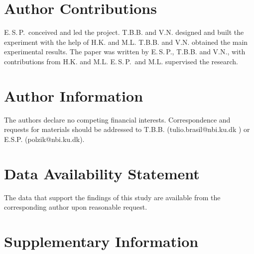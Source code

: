 \documentclass[final,twocolumn,english,prl,notitlepage,nofootinbib,floatfix,longbibliography,superscriptaddress
]{revtex4-2}
\begin{document}
\section*{Author Contributions}
E.\,S.\,P.\ conceived and led the project. 
T.B.B. and V.N. designed and built the experiment with the help of H.K. and M.L. T.B.B. and V.N. obtained the main experimental results.
The paper was written by E.\,S.\,P., T.B.B. and V.N., with contributions from H.K. and M.L. E.\,S.\,P.\ and M.L. supervised the research.

\section*{Author Information}
 The authors declare no competing financial 
interests. Correspondence and 
requests for materials should be addressed to T.B.B. (tulio.brasil@nbi.ku.dk ) or E.S.P. (polzik@nbi.ku.dk).

\section*{Data Availability Statement}
The data that support the findings of this study are available from the corresponding author upon reasonable request.


\appendix
\clearpage

\setcounter{page}{1}
\renewcommand{\thepage}{SI~\arabic{page}}

\setcounter{figure}{0}
\renewcommand{\thefigure}{SI\arabic{figure}}

\setcounter{table}{0}
\renewcommand{\thetable}{SI\arabic{table}}

\setcounter{equation}{0}
\renewcommand{\theequation}{SI~\thesection.\arabic{equation}}

\clearpage
\onecolumngrid
\section*{Supplementary Information}
\end{document}
